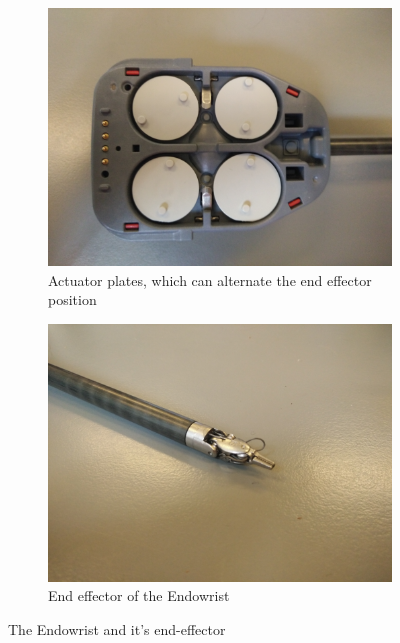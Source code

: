 \documentclass[conference]{IEEEtran}
\begin{document}
\begin{figure}
	\centering
	\begin{subfigure}{.22\textwidth}
		\centering
		\includegraphics[width=\linewidth]{Endowrist2.jpg}
		\caption{Actuator plates, which can alternate the end effector position}
		\label{fig:Endo_plates}
	\end{subfigure}
	\begin{subfigure}{.22\textwidth}
		\centering
		\includegraphics[width=\linewidth]{Endowrist3.jpg}
		\caption{End effector of the Endowrist\newline}
		\label{fig:Endo_end}
	\end{subfigure}
\caption{The Endowrist and it's end-effector}
\label{fig:endowrits_set}
\end{figure}
\end{document}
